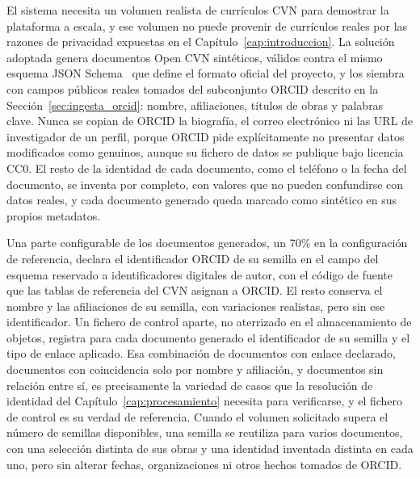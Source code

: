 El sistema necesita un volumen realista de currículos CVN para demostrar
la plataforma a escala, y ese volumen no puede provenir de currículos
reales por las razones de privacidad expuestas en el
Capítulo~\ref{cap:introduccion}. La solución adoptada genera documentos
Open CVN sintéticos, válidos contra el mismo esquema JSON
Schema~\cite{json_schema_org} que define el formato oficial del proyecto,
y los siembra con campos públicos reales tomados del subconjunto ORCID
descrito en la Sección~\ref{sec:ingesta_orcid}: nombre, afiliaciones,
títulos de obras y palabras clave. Nunca se copian de ORCID la biografía,
el correo electrónico ni las URL de investigador de un perfil, porque
ORCID pide explícitamente no presentar datos modificados como genuinos,
aunque su fichero de datos se publique bajo licencia CC0. El resto de la
identidad de cada documento, como el teléfono o la fecha del documento,
se inventa por completo, con valores que no pueden confundirse con datos
reales, y cada documento generado queda marcado como sintético en sus
propios metadatos.

Una parte configurable de los documentos generados, un 70\% en la
configuración de referencia, declara el identificador ORCID de su
semilla en el campo del esquema reservado a identificadores digitales de
autor, con el código de fuente que las tablas de referencia del CVN
asignan a ORCID. El resto conserva el nombre y las afiliaciones de su
semilla, con variaciones realistas, pero sin ese identificador. Un fichero
de control aparte, no aterrizado en el almacenamiento de objetos, registra
para cada documento generado el identificador de su semilla y el tipo de
enlace aplicado. Esa combinación de documentos con enlace declarado,
documentos con coincidencia solo por nombre y afiliación, y documentos sin
relación entre sí, es precisamente la variedad de casos que la resolución
de identidad del Capítulo~\ref{cap:procesamiento} necesita para
verificarse, y el fichero de control es su verdad de referencia. Cuando el
volumen solicitado supera el número de semillas disponibles, una semilla
se reutiliza para varios documentos, con una selección distinta de sus
obras y una identidad inventada distinta en cada uno, pero sin alterar
fechas, organizaciones ni otros hechos tomados de ORCID.

